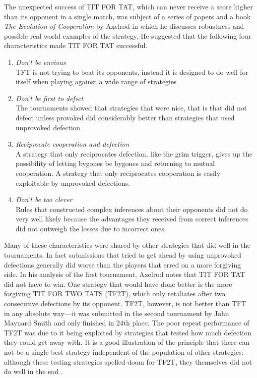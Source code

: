 The unexpected success of TIT FOR TAT, which can never receive a score higher than its opponent in a single match, was subject of a series of papers and a book \textit{The Evolution of Cooperation} by Axelrod in which he discusses robustness and possible real world examples of the strategy. He suggested that the following four characteristics made TIT FOR TAT successful.
\begin{enumerate}
\item \textit{Don't be envious} \\
TFT is not trying to beat its opponents, instead it is designed to do well for itself when playing against a wide range of strategies
\item \textit{Don't be first to defect} \\
The tournaments showed that strategies that were nice, that is that did not defect unless provoked did considerably better than strategies that used unprovoked defection
\item \textit{Reciprocate cooperation and defection} \\
A strategy that only reciprocates defection, like the grim trigger, gives up the possibility of letting bygones be bygones and returning to mutual cooperation. A strategy that only reciprocates cooperation is easily exploitable by unprovoked defections.
\item \textit{Don't be too clever} \\
Rules that constructed complex inferences about their opponents did not do very well likely because the advantages they received from correct inferences did not outweigh the losses due to incorrect ones
\end{enumerate}

Many of these characteristics were shared by other strategies that did well in the tournaments. In fact submissions that tried to get ahead by using unprovoked defections generally did worse than the players that erred on a more forgiving side. In his analysis of the first tournament, Axelrod notes that TIT FOR TAT did not have to win. One strategy that would have done better is the more forgiving TIT FOR TWO TATS (TF2T), which only retaliates after two consecutive defections by its opponent. TF2T, however, is not better than TFT in any absolute way---it was submitted in the second tournament by John Maynard Smith and only finished in 24th place. The poor repeat performance of TF2T was due to it being exploited by strategies that tested how much defection they could get away with. It is a good illustration of the principle that there can not be a single best strategy independent of the population of other strategies: although these testing strategies spelled doom for TF2T, they themselves did not do well in the end \cite[p.47]{axelrod1984evolution}.

